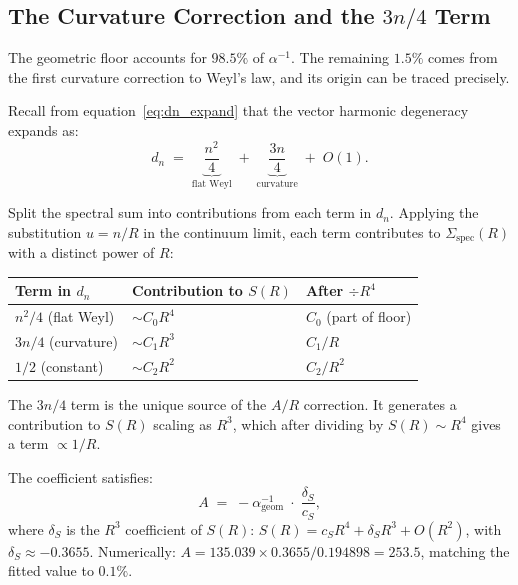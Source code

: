 \documentclass[12pt,a4paper]{article}
\newcommand{\ai}{\alpha^{-1}}
\newcommand{\Ss}{\Sigma_{\mathrm{spec}}}
\newcommand{\floor}{\ai_{\mathrm{geom}}}
\begin{document}
\subsection{The Curvature Correction and the $3n/4$ Term}
\label{sec:curvcorr}

The geometric floor accounts for $98.5\%$ of
$\alpha^{-1}$.
The remaining $1.5\%$ comes from the first curvature
correction to Weyl's law, and its origin can be
traced precisely.

Recall from equation~\eqref{eq:dn_expand} that the
vector harmonic degeneracy expands as:
\begin{equation}
  d_n
  \;=\;
  \underbrace{\frac{n^2}{4}}_{\text{flat Weyl}}
  \;+\;
  \underbrace{\frac{3n}{4}}_{\text{curvature}}
  \;+\; O(1).
\end{equation}

\begin{Tbox}
\label{thm:3n4}
Split the spectral sum into contributions
from each term in $d_n$.
Applying the substitution $u = n/R$ in the
continuum limit, each term contributes to $\Ss(R)$
with a distinct power of $R$:

\begin{center}
\begin{tabular}{lll}
\toprule
Term in $d_n$ & Contribution to $S(R)$ & After $\div R^4$ \\
\midrule
$n^2/4$ (flat Weyl) & $\sim C_0 R^4$ & $C_0$ (part of floor) \\
$3n/4$ (curvature) & $\sim C_1 R^3$ & $C_1/R$ \\
$1/2$ (constant) & $\sim C_2 R^2$ & $C_2/R^2$ \\
\bottomrule
\end{tabular}
\end{center}

The $3n/4$ term is the unique source of the
$A/R$ correction.
It generates a contribution to $S(R)$ scaling
as $R^3$, which after dividing by $S(R) \sim R^4$
gives a term $\propto 1/R$.

The coefficient satisfies:
\begin{equation}
  A \;=\; -\floor\;\cdot\;\frac{\delta_S}{c_S},
\label{eq:A_identity}
\end{equation}
where $\delta_S$ is the $R^3$ coefficient of $S(R)$:
$S(R) = c_S R^4 + \delta_S R^3 + O(R^2)$,
with $\delta_S \approx -0.3655$.
Numerically: $A = 135.039 \times 0.3655/0.194898
= 253.5$, matching the fitted value to $0.1\%$.
\end{Tbox}
\end{document}
